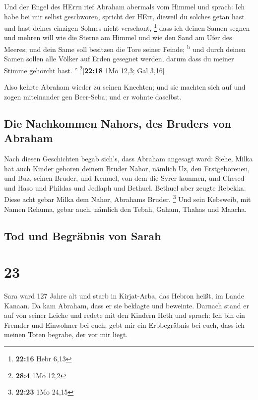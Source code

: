  Und der Engel des HErrn rief Abraham abermals vom Himmel
 und sprach: Ich habe bei mir selbst geschworen, spricht
der HErr, dieweil du solches getan hast und hast deines einzigen Sohnes
nicht verschont, \footnote{\textbf{22:16} Hebr 6,13} 
dass ich deinen Samen segnen und mehren will wie die Sterne am Himmel
und wie den Sand am Ufer des Meeres; und dein Same soll besitzen die
Tore seiner Feinde; \textsuperscript{b}  und durch deinen
Samen sollen alle Völker auf Erden gesegnet werden, darum dass du meiner
Stimme gehorcht hast. \textsuperscript{c} \footnote{\textbf{28:4} 1Mo
  12,2}{[}\textbf{22:18} 1Mo 12,3; Gal 3,16{]}

 Also kehrte Abraham wieder zu seinen Knechten; und sie
machten sich auf und zogen miteinander gen Beer-Seba; und er wohnte
daselbst.

\hypertarget{die-nachkommen-nahors-des-bruders-von-abraham}{%
\subsection{Die Nachkommen Nahors, des Bruders von
Abraham}\label{die-nachkommen-nahors-des-bruders-von-abraham}}

 Nach diesen Geschichten begab sich's, dass Abraham
angesagt ward: Siehe, Milka hat auch Kinder geboren deinem Bruder Nahor,
 nämlich Uz, den Erstgeborenen, und Buz, seinen Bruder,
und Kemuel, von dem die Syrer kommen,  und Chesed und
Haso und Phildas und Jedlaph und Bethuel.  Bethuel aber
zeugte Rebekka. Diese acht gebar Milka dem Nahor, Abrahams Bruder.
\footnote{\textbf{22:23} 1Mo 24,15}  Und sein Kebsweib,
mit Namen Rehuma, gebar auch, nämlich den Tebah, Gaham, Thahas und
Maacha.

\hypertarget{tod-und-begruxe4bnis-von-sarah}{%
\subsection{Tod und Begräbnis von
Sarah}\label{tod-und-begruxe4bnis-von-sarah}}

\hypertarget{section-22}{%
\section{23}\label{section-22}}

 Sara ward 127 Jahre alt  und starb in
Kirjat-Arba, das Hebron heißt, im Lande Kanaan. Da kam Abraham, dass er
sie beklagte und beweinte.  Darnach stand er auf von
seiner Leiche und redete mit den Kindern Heth und sprach: 
Ich bin ein Fremder und Einwohner bei euch; gebt mir ein Erbbegräbnis
bei euch, dass ich meinen Toten begrabe, der vor mir liegt.

